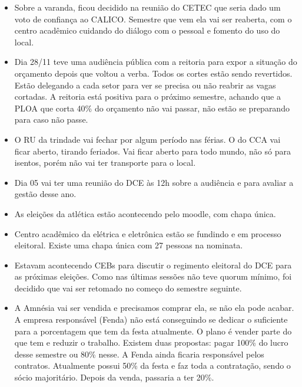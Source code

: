 \documentclass{ata-calico}
\begin{document}
\maketitle

\begin{itemize}
\item Sobre a varanda, ficou decidido na reunião do CETEC que seria dado um voto de confiança ao CALICO. Semestre que vem ela vai ser reaberta, com o centro acadêmico cuidando do diálogo com o pessoal e fomento do uso do local.
\item Dia 28/11 teve uma audiência pública com a reitoria para expor a situação do orçamento depois que voltou a verba. Todos os cortes estão sendo revertidos. Estão delegando a cada setor para ver se precisa ou não reabrir as vagas cortadas. A reitoria está positiva para o próximo semestre, achando que a PLOA que corta 40\% do orçamento não vai passar, não estão se preparando para caso não passe.
\item O RU da trindade vai fechar por algum período nas férias. O do CCA vai ficar aberto, tirando feriados. Vai ficar aberto para todo mundo, não só para isentos, porém não vai ter transporte para o local.
\item Dia 05 vai ter uma reunião do DCE às 12h sobre a audiência e para avaliar a gestão desse ano.
\item As eleições da atlética estão acontecendo pelo moodle, com chapa única.
\item Centro acadêmico da elétrica e eletrônica estão se fundindo e em processo eleitoral. Existe uma chapa única com 27 pessoas na nominata.
\item Estavam acontecendo CEBs para discutir o regimento eleitoral do DCE para as próximas eleições. Como nas últimas sessões não teve quorum mínimo, foi decidido que vai ser retomado no começo do semestre seguinte.
\item A Amnésia vai ser vendida e precisamos comprar ela, se não ela pode acabar. A empresa responsável (Fenda) não está conseguindo se dedicar o suficiente para a porcentagem que tem da festa atualmente. O plano é vender parte do que tem e reduzir o trabalho. Existem duas propostas: pagar 100\% do lucro desse semestre ou 80\% nesse. A Fenda ainda ficaria responsável pelos contratos. Atualmente possui 50\% da festa e faz toda a contratação, sendo o sócio majoritário. Depois da venda, passaria a ter 20\%.
\end{itemize}
\end{document}
